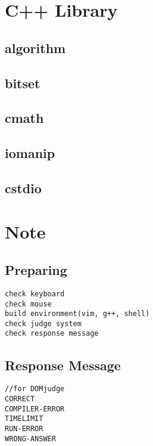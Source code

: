 \documentclass[a4paper, landscape, 8pt]{article}
\begin{document}
\begin{multicols*}{3}
\section{C++ Library}
\subsection{algorithm}

\subsection{bitset}

\subsection{cmath}

\subsection{iomanip}

\subsection{cstdio}


\section{Note}
\subsection{Preparing}
\begin{lstlisting}[]
check keyboard
check mouse
build environment(vim, g++, shell)
check judge system
check response message
\end{lstlisting}
\subsection{Response Message}
\begin{lstlisting}[]
//for DOMjudge
CORRECT
COMPILER-ERROR
TIMELIMIT
RUN-ERROR
WRONG-ANSWER
\end{lstlisting}

\end{multicols*}
\end{document}
